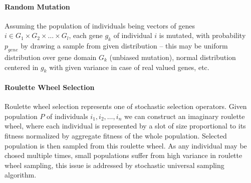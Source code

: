 \paragraph{Random Mutation}
Assuming the population of individuals being vectors of genes $i \in G_1 \times G_2 \times \dots \times G_l$, each gene $g_k$ of individual $i$ is mutated, with probability $p_{gene}$ by drawing a sample from given distribution -- this may be uniform distribution over gene domain $G_k$ (unbiased mutation), normal distribution centered in $g_k$ with given variance in case of real valued genes, etc.

\paragraph{Roulette Wheel Selection}
Roulette wheel selection represents one of stochastic selection operators. Given population $P$ of individuals $i_1, i_2, \dots, i_n$ we can construct an imaginary roulette wheel, where each individual is represented by a slot of size proportional to its fitness normalized by aggregate fitness of the whole population. Selected population is then sampled from this roulette wheel. As any individual may be chosed multiple times, small populations suffer from high variance in roulette wheel sampling, this issue is addressed by stochastic universal sampling algorithm.
